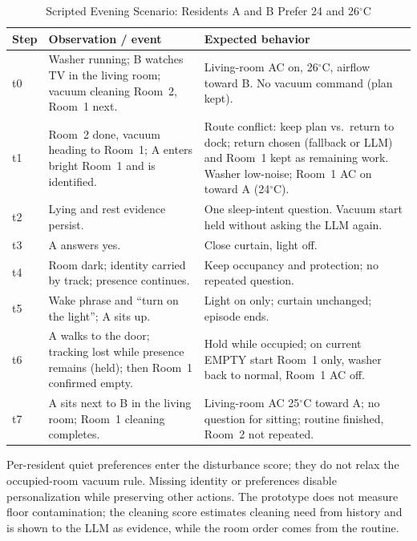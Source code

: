 \documentclass[conference]{IEEEtran}
\begin{document}
\begin{table}[!t]
\caption{Scripted Evening Scenario: Residents A and B
Prefer 24 and 26$^\circ$C}
\label{tab:scenario}
\centering
\small
\begin{tabularx}{\textwidth}{
@{}L{0.04\textwidth}L{0.36\textwidth}Y@{}
}
\toprule
\textbf{Step} & \textbf{Observation / event}
& \textbf{Expected behavior} \\
\midrule
t0
& Washer running; B watches TV in the living room; vacuum cleaning
Room~2, Room~1 next.
& Living-room AC on, 26$^\circ$C, airflow toward B. No vacuum
command (plan kept). \\

t1
& Room~2 done, vacuum heading to Room~1; A enters bright Room~1 and
is identified.
& Route conflict: keep plan vs.\ return to dock; return chosen
(fallback or LLM) and Room~1 kept as remaining work. Washer
low-noise; Room~1 AC on toward A (24$^\circ$C). \\

t2
& Lying and rest evidence persist.
& One sleep-intent question. Vacuum start held without asking the
LLM again. \\

t3
& A answers yes.
& Close curtain, light off. \\

t4
& Room dark; identity carried by track; presence continues.
& Keep occupancy and protection; no repeated question. \\

t5
& Wake phrase and ``turn on the light''; A sits up.
& Light on only; curtain unchanged; episode ends. \\

t6
& A walks to the door; tracking lost while presence remains
(held); then Room~1 confirmed empty.
& Hold while occupied; on current EMPTY start Room~1 only, washer
back to normal, Room~1 AC off. \\

t7
& A sits next to B in the living room; Room~1 cleaning completes.
& Living-room AC 25$^\circ$C toward A; no question for sitting;
routine finished, Room~2 not repeated. \\
\bottomrule
\end{tabularx}
\end{table}

Per-resident quiet preferences enter the disturbance score; they do
not relax the occupied-room vacuum rule. Missing identity or
preferences disable personalization while preserving other actions.
The prototype does not measure floor contamination; the cleaning
score estimates cleaning need from history and is shown to the LLM
as evidence, while the room order comes from the routine.
\end{document}
